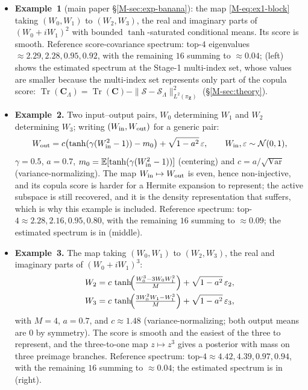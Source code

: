 \documentclass[supplement,review,hidelinks,onefignum,onetabnum]{siamart251216}
\newcommand{\EE}{\mathbb{E}}
\newcommand{\Var}{\mathrm{Var}}
\newcommand{\tr}{\operatorname{Tr}}
\newcommand{\mC}{\bm{C}}
\newcommand{\vZ}{\bm{Z}}
\newcommand{\scS}{\mathcal{S}}
\begin{document}
\begin{itemize}\itemsep0pt
\item \textbf{Example~1} (main paper \S\ref{M-sec:exp-banana}): the map \eqref{M-eq:ex1-block} taking $(W_0,W_1)$ to $(W_2,W_3)$, the real and imaginary parts of $(W_0+iW_1)^2$ with bounded $\tanh$-saturated conditional means. Its score is smooth. Reference score-covariance spectrum: top-$4$ eigenvalues $\approx 2.29, 2.28, 0.95, 0.92$, with the remaining $16$ summing to $\approx 0.04$;  (left) shows the estimated spectrum at the Stage-1 multi-index set, whose values are smaller because the multi-index set represents only part of the copula score: $\tr(\mC_\Lambda) = \tr(\mC) - \|\scS - \scS_\Lambda\|^2_{L^2(\pi_{\vZ})}$ (\S\ref{M-sec:theory}).
\item \textbf{Example~2.} Two input--output pairs, $W_0$ determining $W_1$ and $W_2$ determining $W_3$; writing $(W_{\rm in}, W_{\rm out})$ for a generic pair:
\[
W_{\rm out} = c\bigl(\tanh(\gamma (W_{\rm in}^2 - 1)) - m_0\bigr) + \sqrt{1 - a^2}\,\varepsilon, \qquad W_{\rm in}, \varepsilon \sim \mathcal N(0,1),
\]
$\gamma = 0.5$, $a = 0.7$, $m_0 = \EE[\tanh(\gamma(W_{\rm in}^2-1))]$ (centering) and $c = a/\sqrt{\Var}$ (variance-normalizing). The map $W_{\rm in} \mapsto W_{\rm out}$ is even, hence non-injective, and its copula score is harder for a Hermite expansion to represent; the active subspace is still recovered, and it is the density representation that suffers, which is why this example is included. Reference spectrum: top-$4 \approx 2.28, 2.16, 0.95, 0.80$, with the remaining $16$ summing to $\approx 0.09$; the estimated spectrum is in  (middle).
\item \textbf{Example~3.} The map taking $(W_0,W_1)$ to $(W_2,W_3)$, the real and imaginary parts of $(W_0+iW_1)^3$:
\[
\begin{gathered}
W_2 = c\,\tanh\!\Bigl(\tfrac{W_0^3 - 3 W_0 W_1^2}{M}\Bigr) + \sqrt{1-a^2}\,\varepsilon_2, \\
W_3 = c\,\tanh\!\Bigl(\tfrac{3 W_0^2 W_1 - W_1^3}{M}\Bigr) + \sqrt{1-a^2}\,\varepsilon_3,
\end{gathered}
\]
with $M = 4$, $a = 0.7$, and $c \approx 1.48$ (variance-normalizing; both output means are $0$ by symmetry). The score is smooth and the easiest of the three to represent, and the three-to-one map $z \mapsto z^3$ gives a posterior with mass on three preimage branches. Reference spectrum: top-$4 \approx 4.42, 4.39, 0.97, 0.94$, with the remaining $16$ summing to $\approx 0.04$; the estimated spectrum is in  (right).
\end{itemize}
\end{document}
